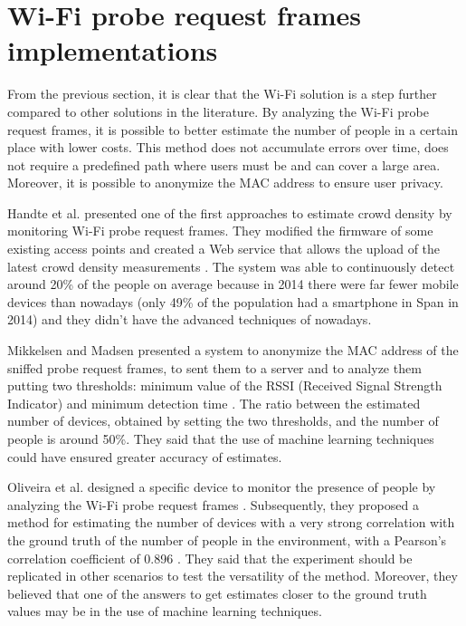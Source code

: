 \section{Wi-Fi probe request frames implementations}
\label{sec:probe}
\vspace{0.2 cm}

From the previous section, it is clear that the Wi-Fi solution is a step further compared to other solutions in the literature. By analyzing the Wi-Fi probe request frames, it is possible to better estimate the number of people in a certain place with lower costs. This method does not accumulate errors over time, does not require a predefined path where users must be and can cover a large area. Moreover, it is possible to anonymize the MAC address to ensure user privacy.

Handte et al. presented one of the first approaches to estimate crowd density by monitoring Wi-Fi probe request frames. They modified the firmware of some existing access points and created a Web service that allows the upload of the latest crowd density measurements \cite{handte2014crowd}. The system was able to continuously detect around 20\% of the people on average because in 2014 there were far fewer mobile devices than nowadays (only 49\% of the population had a smartphone in Span in 2014) and they didn't have the advanced techniques of nowadays.

Mikkelsen and Madsen presented a system to anonymize the MAC address of the sniffed probe request frames, to sent them to a server and to analyze them putting two thresholds: minimum value of the RSSI (Received Signal Strength Indicator) and minimum detection time \cite{mikkelsen2016public}. The ratio between the estimated number of devices, obtained by setting the two thresholds, and the number of people is around 50\%. They said that the use of machine learning techniques could have ensured greater accuracy of estimates.

Oliveira et al. designed a specific device to monitor the presence of people by analyzing the Wi-Fi probe request frames \cite{oliveira2018sherlock}. Subsequently, they proposed a method for estimating the number of devices with a very strong correlation with the ground truth of the number of people in the environment, with a Pearson’s correlation coefficient of 0.896 \cite{oliveira2019mobile}. They said that the experiment should be replicated in other scenarios to test the versatility of the method. Moreover,  they believed that one of the answers to get estimates closer to the ground truth values may be in the use of machine learning techniques.

